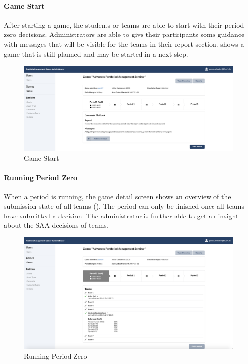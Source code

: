 \paragraph{Game Start}
After starting a game, the students or teams are able to start with their period zero decisions. Administrators are able to give their participants some guidance with messages that will be visible for the teams in their report section.  shows a game that is still planned and may be started in a next step.
\begin{figure}[h!]
  \centering
  \includegraphics[scale=0.2]{img/application-overview/administrator/05_game_start.png}
  \caption{Game Start}
  \label{fig:game_start}
\end{figure}

\paragraph{Running Period Zero}
When a period is running, the game detail screen shows an overview of the submission state of all teams (). The period can only be finished once all teams have submitted a decision. The administrator is further able to get an insight about the SAA decisions of teams.
\begin{figure}[h!]
  \centering
  \includegraphics[scale=0.2]{img/application-overview/administrator/07_running_game.png}
  \caption{Running Period Zero}
  \label{fig:running_period}
\end{figure}

